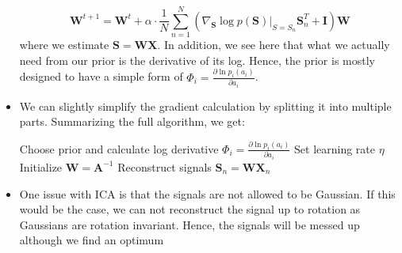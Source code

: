 \begin{itemize}
	$$\bm{W}^{t+1}=\bm{W}^{t} + \alpha \cdot \frac{1}{N}\sum_{n=1}^{N}\left(\nabla_{\bm{S}} \log p(\bm{S})\Big\vert_{S=S_n}\bm{S}_n^T+\bm{I}\right)\bm{W}$$
	where we estimate $\bm{S}=\bm{W}\bm{X}$. In addition, we see here that what we actually need from our prior is the derivative of its log. Hence, the prior is mostly designed to have a simple form of $\Phi_i=\frac{\partial \ln p_i(a_i)}{\partial a_i}$.
	\item We can slightly simplify the gradient calculation by splitting it into multiple parts. Summarizing the full algorithm, we get:
	\begin{tcolorbox}[colback=white!80!gray,colframe=gray!75!black,title=Independent Component Analysis]
		\begin{algorithm}[H]
			\SetAlgoLined
			Choose prior and calculate log derivative $\Phi_i=\frac{\partial \ln p_i(a_i)}{\partial a_i}$\;
			Set learning rate $\eta$\;
			Initialize $\bm{W}=\bm{A}^{-1}$\;
			Reconstruct signals $\bm{S}_n=\bm{W}\bm{X}_n$\;
		\end{algorithm}
	\end{tcolorbox} 
	\item One issue with ICA is that the signals are not allowed to be Gaussian. If this would be the case, we can not reconstruct the signal up to rotation as Gaussians are rotation invariant. Hence, the signals will be messed up although we find an optimum
\end{itemize}
